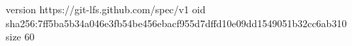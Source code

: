 version https://git-lfs.github.com/spec/v1
oid sha256:7ff5ba5b34a046e3fb54be456ebacf955d7dffd10e09dd1549051b32cc6ab310
size 60
